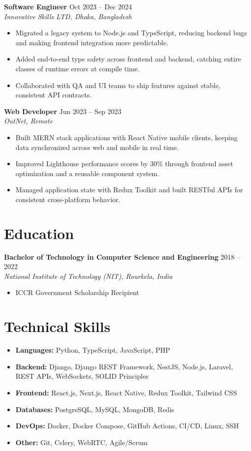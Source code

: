 \documentclass[11pt,a4paper]{article}
\newcommand{\resumeItem}[1]{\item[--] #1}
\newenvironment{resumeList}{\begin{itemize}[leftmargin=1.1em,itemsep=1pt,parsep=0pt,topsep=2pt]}{\end{itemize}}
\newcommand{\resumeEntry}[4]{
  \noindent\textbf{#1} \hfill #2 \\
  \textit{#3} \hfill \textit{#4}
}
\begin{document}
\vspace{4pt}
\resumeEntry{Software Engineer}{Oct 2023 -- Dec 2024}{Innovative Skills LTD, Dhaka, Bangladesh}{}
\begin{resumeList}
    \resumeItem{Migrated a legacy system to Node.js and TypeScript, reducing backend bugs and making frontend integration more predictable.}
    \resumeItem{Added end-to-end type safety across frontend and backend, catching entire classes of runtime errors at compile time.}
    \resumeItem{Collaborated with QA and UI teams to ship features against stable, consistent API contracts.}
\end{resumeList}

\vspace{4pt}
\resumeEntry{Web Developer}{Jun 2023 -- Sep 2023}{OutNet, Remote}{}
\begin{resumeList}
    \resumeItem{Built MERN stack applications with React Native mobile clients, keeping data synchronized across web and mobile in real time.}
    \resumeItem{Improved Lighthouse performance scores by 30\% through frontend asset optimization and a reusable component system.}
    \resumeItem{Managed application state with Redux Toolkit and built RESTful APIs for consistent cross-platform behavior.}
\end{resumeList}

\section*{Education}
\resumeEntry{Bachelor of Technology in Computer Science and Engineering}{2018 -- 2022}{National Institute of Technology (NIT), Rourkela, India}{}
\begin{resumeList}
    \resumeItem{ICCR Government Scholarship Recipient}
\end{resumeList}

\section*{Technical Skills}
\begin{itemize}[leftmargin=1.1em,itemsep=2pt,parsep=0pt,topsep=2pt]
    \item \textbf{Languages:} Python, TypeScript, JavaScript, PHP
    \item \textbf{Backend:} Django, Django REST Framework, NestJS, Node.js, Laravel, REST APIs, WebSockets, SOLID Principles
    \item \textbf{Frontend:} React.js, Next.js, React Native, Redux Toolkit, Tailwind CSS
    \item \textbf{Databases:} PostgreSQL, MySQL, MongoDB, Redis
    \item \textbf{DevOps:} Docker, Docker Compose, GitHub Actions, CI/CD, Linux, SSH
    \item \textbf{Other:} Git, Celery, WebRTC, Agile/Scrum
\end{itemize}
\end{document}
